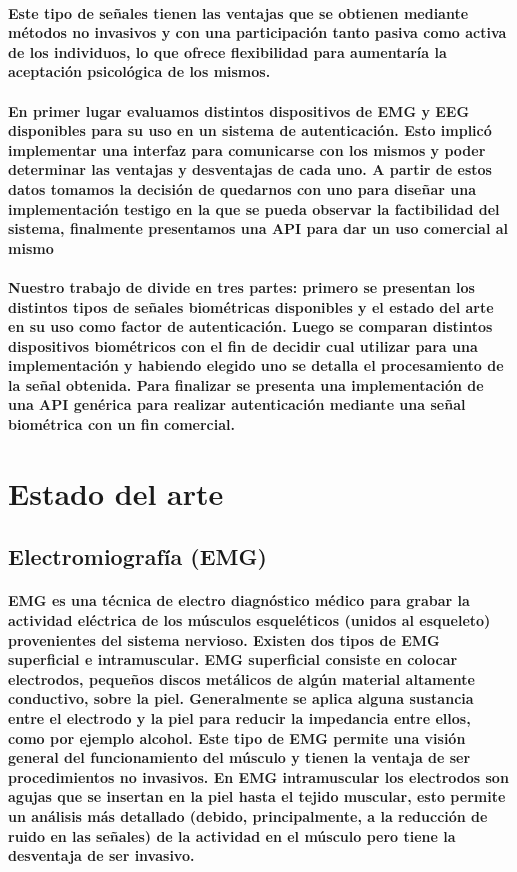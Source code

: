 \documentclass{article}
\begin{document}
\paragraph{
Este tipo de señales tienen las ventajas que se obtienen mediante métodos no invasivos y con una participación tanto pasiva como activa de los individuos, lo que ofrece flexibilidad para aumentaría la aceptación psicológica de los mismos.
}
\paragraph{
En primer lugar evaluamos distintos dispositivos de EMG y EEG disponibles para su uso en un sistema de autenticación. Esto implicó implementar una interfaz para comunicarse con los mismos y poder determinar las ventajas y desventajas de cada uno. A partir de estos datos tomamos la decisión de quedarnos con uno para diseñar una implementación testigo en la que se pueda observar la factibilidad del sistema, finalmente presentamos una API para dar un uso comercial al mismo
}
\paragraph{
Nuestro trabajo de divide en tres partes: primero se presentan los distintos tipos de señales biométricas disponibles y el estado del arte en su uso como factor de autenticación. Luego se comparan distintos dispositivos biométricos con el fin de decidir cual utilizar para una implementación y habiendo elegido uno se detalla el procesamiento de la señal obtenida. Para finalizar se presenta una implementación de una API genérica para realizar autenticación mediante una señal biométrica con un fin comercial.
}

\section{Estado del arte}
\subsection{Electromiografía (EMG)}
\paragraph{
EMG es una técnica de electro diagnóstico médico para grabar la actividad eléctrica de los músculos esqueléticos (unidos al esqueleto) provenientes del sistema nervioso. Existen dos tipos de EMG superficial e intramuscular. EMG superficial consiste en colocar electrodos, pequeños discos metálicos de algún material altamente conductivo, sobre la piel. Generalmente se aplica alguna sustancia entre el electrodo y la piel para reducir la impedancia entre ellos, como por ejemplo alcohol. Este tipo de EMG permite una visión general del funcionamiento del músculo y tienen la ventaja de ser procedimientos no invasivos. En EMG intramuscular los electrodos son agujas que se insertan en la piel hasta el tejido muscular, esto permite un análisis más detallado (debido, principalmente, a la reducción de ruido en las señales) de la actividad en el músculo pero tiene la desventaja de ser invasivo.
}
\end{document}
